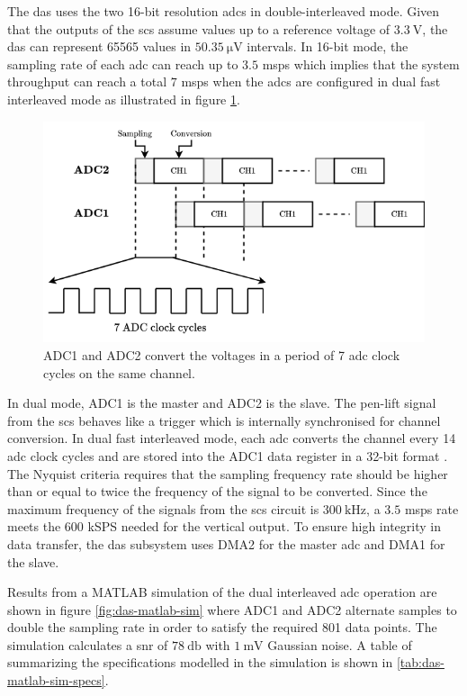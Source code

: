 \documentclass[class=report,11pt,crop=false]{standalone}
\begin{document}
	The \acrshort{das} uses the two 16-bit resolution \acrshort{adc}s in double-interleaved mode. Given that the outputs of the \acrshort{scs} assume values up to a reference voltage of $\SI{3.3}{\volt}$, the \acrshort{das} can represent 65565 values in $\SI{50.35}{\micro\volt}$ intervals. In 16-bit mode, the sampling rate of each \acrshort{adc} can reach up to $3.5$ \acrshort{msps} which implies that the system throughput can reach a total $7$ \acrshort{msps} when the \acrshort{adc}s are configured in dual fast interleaved mode as illustrated in figure \ref{fig:das-adc-df-interleaved-mode}. 
	
	\begin{figure}[h!]
		\centering
		\includegraphics[width=0.55\linewidth]{Figures/Methodology/das-adc-df-interleaved-mode}
		\caption{ADC1 and ADC2 convert the voltages in a period of 7 \acrshort{adc} clock cycles on the same channel.}
		\label{fig:das-adc-df-interleaved-mode}
	\end{figure} 
	
	In dual mode, ADC1 is the master and ADC2 is the slave. The pen-lift signal from the \acrshort{scs} behaves like a trigger which is internally synchronised for channel conversion. In dual fast interleaved mode, each \acrshort{adc} converts the channel every 14 \acrshort{adc} clock cycles and are stored into the ADC1 data register in a 32-bit format \cite{stm32adcmodes}. The Nyquist criteria requires that the sampling frequency rate should be higher than or equal to twice the frequency of the signal to be converted. Since the maximum frequency of the signals from the \acrshort{scs} circuit is $\SI{300}{\kilo\hertz}$, a $3.5$ \acrshort{msps} rate meets the $600$ kSPS needed for the vertical output. To ensure high integrity in data transfer, the \acrfull{das} subsystem uses DMA2 for the master \acrshort{adc} and DMA1 for the slave. 
	
	Results from a MATLAB simulation of the dual interleaved \acrshort{adc} operation are shown in figure \ref{fig:das-matlab-sim} where ADC1 and ADC2 alternate samples to double the sampling rate in order to satisfy the required 801 data points. The simulation calculates a \acrshort{snr} of $\SI{78}{\decibel}$ with $\SI{1}{\milli\volt}$ Gaussian noise. A table of summarizing the specifications modelled in the simulation is shown in \ref{tab:das-matlab-sim-specs}.
	
\end{document}
